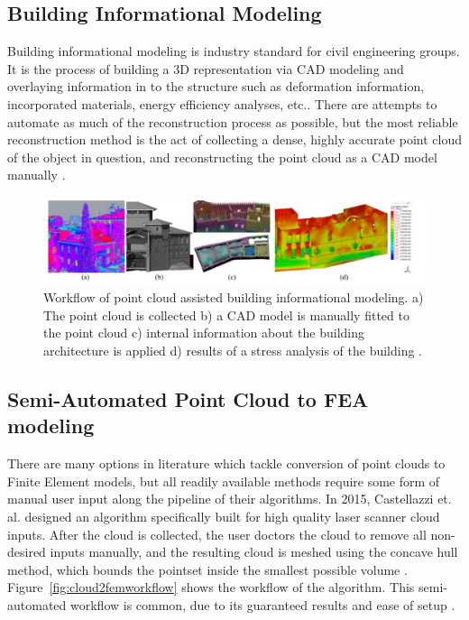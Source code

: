 \documentclass[12pt]{drexelthesis}
\let\Oldsubsection\subsection
\renewcommand{\subsection}{\FloatBarrier\Oldsubsection}
\begin{document}
\subsection{Building Informational Modeling}
\label{subsec:BIM}
Building informational modeling is industry standard for civil engineering groups. It is the process of building a 3D representation via CAD modeling and overlaying information in to the structure such as deformation information, incorporated materials, energy efficiency analyses, etc.. There are attempts to automate as much of the reconstruction process as possible, but the most reliable reconstruction method is the act of collecting a dense, highly accurate point cloud of the object in question, and reconstructing the point cloud as a CAD model manually \cite{RN30}.

\begin{figure}
	\centering
	\includegraphics[width=5in]{introduction/bimworkflow.png}
	\caption[Building informational model workflow]{\centering Workflow of point cloud assisted building informational modeling. a) The point cloud is collected b) a CAD model is manually fitted to the point cloud c) internal information about the building architecture is applied d) results of a stress analysis of the building \cite{RN30}.}
\end{figure}

\subsection{Semi-Automated Point Cloud to FEA modeling}
\label{subsec:SemiFEA}
There are many options in literature which tackle conversion of point clouds to Finite Element models, but all readily available methods require some form of manual user input along the pipeline of their algorithms.  
In 2015, Castellazzi et. al. designed an algorithm specifically built for high quality laser scanner cloud inputs. After the cloud is collected, the user doctors the cloud to remove all non-desired inputs manually, and the resulting cloud is meshed using the concave hull method, which bounds the pointset inside the smallest possible volume \cite{RN29}. Figure~\ref{fig:cloud2femworkflow} shows the workflow of the algorithm. This semi-automated workflow is common, due to its guaranteed results and ease of setup \cite{RN31,RN54}.
\end{document}
